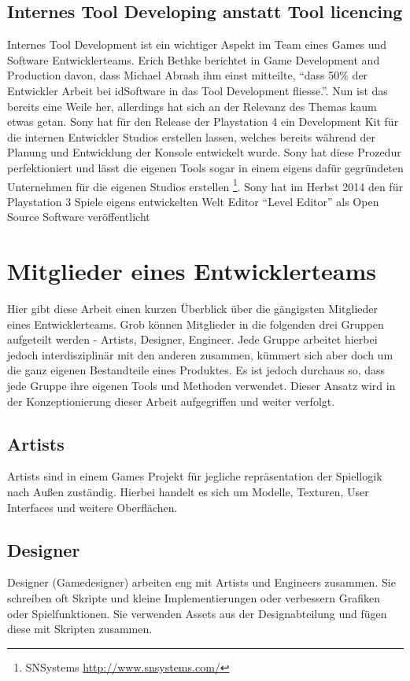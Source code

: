 \documentclass[pagesize, paper=a4, fontsize=12pt,titlepage=true, headings=small, headnosepline, abstractoff, liststotoc, nochapterprefix, plainheadsepline, twoside]{scrreprt}
\begin{document}
\subsection{Internes Tool Developing anstatt Tool licencing} %
Internes Tool Development ist ein wichtiger Aspekt im Team eines Games und Software Entwicklerteams. Erich Bethke berichtet in Game Development and Production davon, dass Michael Abrash ihm einst mitteilte, “dass 50\% der Entwickler Arbeit bei idSoftware in das Tool Development fliesse.”. Nun ist das bereits eine Weile her, allerdings hat sich an der Relevanz des Themas kaum etwas getan. Sony hat für den Release der Playstation 4 ein Development Kit  für die internen Entwickler Studios  erstellen lassen, welches bereits während der Planung und Entwicklung der Konsole entwickelt wurde. Sony hat diese Prozedur perfektioniert und lässt die eigenen Tools sogar in einem eigens dafür gegründeten Unternehmen für die eigenen Studios erstellen \footnote{SNSystems \url{http://www.snsystems.com/}}. Sony hat im Herbst 2014 den für Playstation 3 Spiele eigens entwickelten Welt Editor “Level Editor” als Open Source Software veröffentlicht 

\section{Mitglieder eines Entwicklerteams}
Hier gibt diese Arbeit einen kurzen Überblick über die gängigsten Mitglieder eines Entwicklerteams. Grob können Mitglieder in die folgenden drei Gruppen aufgeteilt werden - Artists, Designer, Engineer. Jede Gruppe arbeitet hierbei jedoch interdisziplinär mit den anderen zusammen, kümmert sich aber doch um die ganz eigenen Bestandteile eines Produktes. Es ist jedoch durchaus so, dass jede Gruppe ihre eigenen Tools und Methoden verwendet. Dieser Ansatz wird in der Konzeptionierung dieser Arbeit aufgegriffen und weiter verfolgt.

\subsection{Artists}
Artists sind in einem Games Projekt für jegliche repräsentation der Spiellogik nach Außen zuständig. Hierbei handelt es sich um Modelle, Texturen, User Interfaces und weitere Oberflächen.
\subsection{Designer}
Designer (Gamedesigner) arbeiten eng mit Artists und Engineers zusammen. Sie schreiben oft Skripte und kleine Implementierungen oder verbessern Grafiken oder Spielfunktionen. Sie verwenden Assets aus der Designabteilung und fügen diese mit Skripten zusammen.
\end{document}
